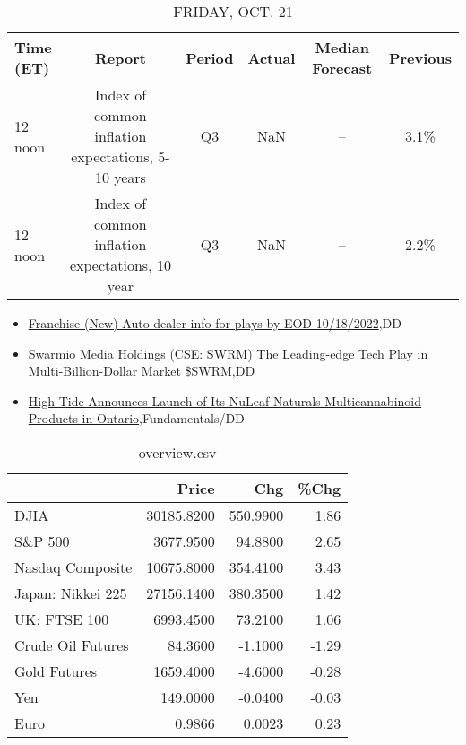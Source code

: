 \documentclass{article}%
\begin{document}
%


\begin{table}[htbp]%
\caption{FRIDAY, OCT. 21}%
\centering%
\begin{adjustbox}{width=1\textwidth}%
\begin{tabular}{lccccc}
\toprule
Time (ET) &                                             Report & Period & Actual & Median Forecast & Previous \\
\midrule
  12 noon & Index of common inflation expectations, 5-10 years &     Q3 &    NaN &              -- &     3.1\% \\
  12 noon &    Index of common inflation expectations, 10 year &     Q3 &    NaN &              -- &     2.2\% \\
\bottomrule
\end{tabular}
%
\end{adjustbox}%
\end{table}

%
\begin{itemize}%
\item%
\href{https://reddit.com/r/wallstreetbets/comments/y772qf/franchise\_new\_auto\_dealer\_info\_for\_plays\_by\_eod/}{Franchise (New) Auto dealer info for plays by EOD 10/18/2022},DD%
\item%
\href{https://reddit.com/r/Baystreetbets/comments/y6dubq/swarmio\_media\_holdings\_cse\_swrm\_the\_leadingedge/}{Swarmio Media Holdings (CSE: SWRM) The Leading-edge Tech Play in Multi-Billion-Dollar Market \$SWRM},DD%
\item%
\href{https://reddit.com/r/StockMarket/comments/y74o0d/high\_tide\_announces\_launch\_of\_its\_nuleaf\_naturals/}{High Tide Announces Launch of Its NuLeaf Naturals Multicannabinoid Products in Ontario},Fundamentals/DD%
\end{itemize}%


\begin{table}[htbp]%
\caption{overview.csv}%
\centering%
\begin{adjustbox}{width=1\textwidth}%
\begin{tabular}{lrrr}
\toprule
                  &      Price &      Chg &  \%Chg \\
\midrule
             DJIA & 30185.8200 & 550.9900 &  1.86 \\
          S\&P 500 &  3677.9500 &  94.8800 &  2.65 \\
 Nasdaq Composite & 10675.8000 & 354.4100 &  3.43 \\
Japan: Nikkei 225 & 27156.1400 & 380.3500 &  1.42 \\
     UK: FTSE 100 &  6993.4500 &  73.2100 &  1.06 \\
Crude Oil Futures &    84.3600 &  -1.1000 & -1.29 \\
     Gold Futures &  1659.4000 &  -4.6000 & -0.28 \\
              Yen &   149.0000 &  -0.0400 & -0.03 \\
             Euro &     0.9866 &   0.0023 &  0.23 \\
\bottomrule
\end{tabular}
%
\end{adjustbox}%
\end{table}
\end{document}
